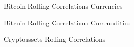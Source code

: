 \documentclass[aspectratio=169]{beamer}
\begin{document}
\begin{frame}{Bitcoin Rolling Correlations}
Currencies
	\begin{figure}
		\centering
		\noindent{}
	\end{figure}
	\end{frame}
\begin{frame}{Bitcoin Rolling Correlations}
    Commodities
	\begin{figure}
		\centering
		\noindent{}
	\end{figure}
\end{frame}
\begin{frame}{Cryptoassets Rolling Correlations}
	\begin{figure}
		\centering
		\noindent{}
	\end{figure}
\end{frame}
\end{document}
